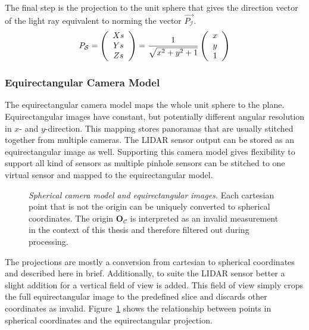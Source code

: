 The final step is the projection to the unit sphere that gives the direction vector of the light ray equivalent to norming the vector $\vec{P_\mathcal{I}}$.
\begin{equation}
    P_\mathcal{S} = \left(\begin{array}{c} Xs \\ Ys \\ Zs \end{array}\right) = \frac{1}{\sqrt{x^2 + y^2 + 1}} \left(\begin{array}{c} x \\ y \\ 1 \end{array}\right)
    \label{eq:pinhole_backward}
\end{equation}

\subsubsection{Equirectangular Camera Model}

The equirectangular camera model maps the whole unit sphere to the plane.
Equirectangular images have constant, but potentially different angular resolution in $x$- and $y$-direction.
This mapping stores panoramas that are usually stitched together from multiple cameras.
The \acrshort{LIDAR} sensor output can be stored as an equirectangular image as well.
Supporting this camera model gives flexibility to support all kind of sensors as multiple pinhole sensors can be stitched to one virtual sensor and mapped to the equirectangular model.

\begin{figure}[H]
    \scalebox{0.9}{%
    
    }
    \caption[Spherical camera model and equirectangular images]{\emph{Spherical camera model and equirectangular images.} Each cartesian point that is not the origin can be uniquely converted to spherical coordinates. The origin $\mathbf{O_\mathcal{C}}$ is interpreted as an invalid measurement in the context of this thesis and therefore filtered out during processing.}\label{fig:spherical}
\end{figure}

The projections are mostly a conversion from cartesian to spherical coordinates and described here in brief.
Additionally, to suite the \acrshort{LIDAR} sensor better a slight addition for a vertical field of view is added.
This field of view simply crops the full equirectangular image to the predefined slice and discards other coordinates as invalid.
Figure~\ref{fig:spherical} shows the relationship between points in spherical coordinates and the equirectangular projection.

